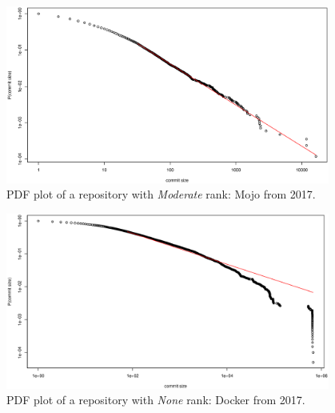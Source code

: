 \documentclass{article}
\begin{document}
\begin{figure}[htbp]
  \centerline{\includegraphics[width=0.95\textwidth]{plots/mojo-2017.eps}}
  \caption{PDF plot of a repository with \textit{Moderate} rank: Mojo
    from 2017.}
  \label{fig:mojo}
\end{figure}



\begin{figure}[htbp]
  \centerline{\includegraphics[width=0.95\textwidth]{plots/docker.eps}}
  \caption{PDF plot of a repository with \textit{None} rank: Docker
    from 2017.}
  \label{fig:docker}
\end{figure}
\end{document}
